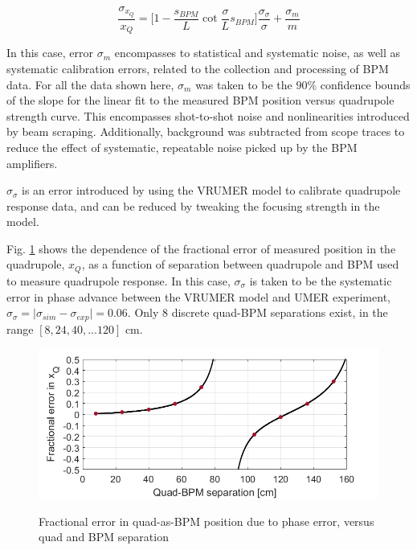 \begin{equation} \frac{\sigma_{x_Q}}{x_Q} = \bigg[1-\frac{s_{BPM}}{L}\cot{\frac{\sigma}{L}s_{BPM}} \bigg]\frac{\sigma_\sigma}{\sigma} + \frac{\sigma_m}{m} 
\label{eq:quad-as-bpm-error}
\end{equation}

In this case, error $\sigma_m$ encompasses to statistical and systematic noise, as well as systematic calibration errors, related to the collection and processing of BPM data. For all the data shown here, $\sigma_m$ was taken to be the $90\%$ confidence bounds of the slope for the linear fit to the measured BPM position versus quadrupole strength curve. This encompasses shot-to-shot noise and nonlinearities introduced by beam scraping. Additionally, background was subtracted from scope traces to reduce the effect of systematic, repeatable noise picked up by the BPM amplifiers. 

$\sigma_\sigma$ is an error introduced by using the VRUMER model to calibrate quadrupole response data, and can be reduced by tweaking the focusing strength in the model. 

Fig. \ref{fig:quad-as-bpm-error} shows the dependence of the fractional error of measured position in the quadrupole, $x_Q$, as a function of separation between quadrupole and BPM used to measure quadrupole response. In this case, $\sigma_\sigma$ is taken to be the systematic error in phase advance between the VRUMER model and UMER experiment, $\sigma_\sigma = \mid \sigma_{sim} - \sigma_{exp} \mid = 0.06$. Only 8 discrete quad-BPM separations exist, in the range $[8,24,40,... 120]$ cm.


\begin{figure}
\begin{center}
\includegraphics[width=\textwidth]{4.figures/quad_as_BPM_error.png}
\end{center}
\renewcommand{\baselinestretch}{1}
\small\normalsize
\begin{quote}
\caption[]{Fractional error in quad-as-BPM position due to phase error, versus quad and BPM separation}
\label{fig:quad-as-bpm-error}
\end{quote}
\end{figure} 
\renewcommand{\baselinestretch}{2}
\small\normalsize


